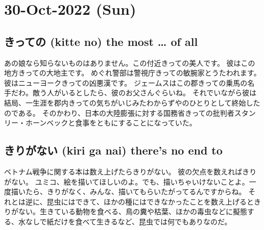 \section{30-Oct-2022 (Sun)}
\subsection{きっての (kitte no) the most … of all}

あの娘なら知らないものはありません。この付近きっての美人です。
彼はこの地方きっての大地主です。
めぐれ警部は警視庁きっての敏腕家とうたわれます。
彼はニューヨークきっての凶悪漢です。
ジェームスはこの郡きっての乗馬の名手だわ。敵う人がいるとしたら、彼のお父さんぐらいね。
それでいながら彼は結局、一生涯を郡内きっての気ちがいじみたわからずやのひとりとして終始したのである。
そのかわり、日本の大陸膨張に対する国務省きっての批判者スタンリー・ホーンベックと食事をともにすることになっていた。

\subsection{きりがない (kiri ga nai) there’s no end to}

ベトナム戦争に関する本は数え上げたらきりがない。
彼の欠点を数えればきりがない。
ユミコ、絵を描いてほしいのよ。でも、描いちゃいけないことよ。一度描いたら、きりがなく、みんな、描いてもらいたがってるんですからね。
それとは逆に、昆虫にはできて、ほかの種にはできなかったことを数え上げるときりがない。生きている動物を食べる、鳥の糞や枯葉、ほかの毒虫などに擬態する、水なしで紙だけを食べて生きるなど、昆虫では何でもありなのだ。